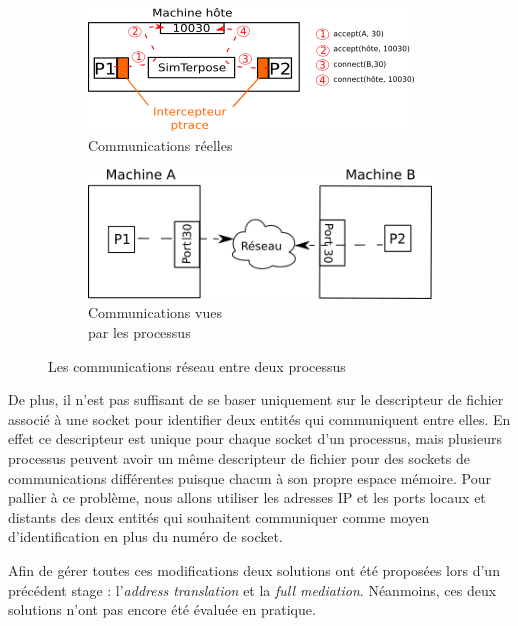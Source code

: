 \begin{figure}[H]
  \centering
  \begin{subfigure}{0.5\textwidth}
    \includegraphics[scale=0.8]{Pictures/png/Mediation_realite}
    \caption{Communications réelles}
  \label{COMM_REALITE}
  \end{subfigure}
  \begin{subfigure}{0.25\textwidth}
  \includegraphics[scale=0.5]{Pictures/png/Mediation_VM}
  \caption{Communications vues \\ par les processus}
  \label{COMM_VM}
  \end{subfigure}
  \caption{Les communications réseau entre deux processus}
  \label{COMM}
\end{figure}

De plus, il n'est pas suffisant de se baser uniquement sur le descripteur de fichier associé à une socket pour identifier deux entités qui communiquent
entre elles. En effet ce descripteur est unique pour chaque socket
d'un processus, mais plusieurs processus peuvent avoir un même descripteur de fichier pour des sockets de communications différentes puisque
chacun à son propre espace mémoire. Pour pallier à ce problème, nous allons utiliser les adresses IP et les ports locaux et distants des
deux entités qui souhaitent communiquer comme moyen d'identification en plus du numéro de socket.

Afin de gérer toutes ces modifications deux solutions ont été proposées lors
d'un précédent stage \citep{GUILLAUME:Interceptionsyscall}: l'\textit{address
  translation} et la \textit{full mediation}. Néanmoins, ces deux solutions
n'ont pas encore été évaluée en pratique.
 
